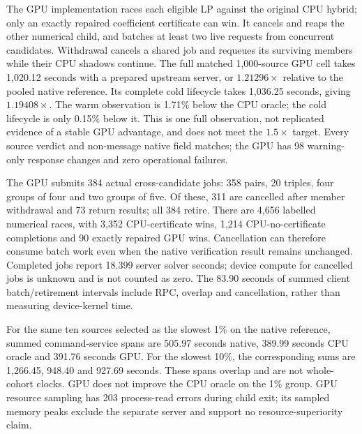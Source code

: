 \documentclass[10pt,twocolumn]{article}
\begin{document}
The GPU implementation races each eligible LP against the original CPU
hybrid; only an exactly repaired coefficient certificate can win.
It cancels and reaps the other numerical child, and batches at least two
live requests from concurrent candidates. Withdrawal cancels a shared job
and requeues its surviving members while their CPU shadows continue.
The full matched 1,000-source GPU cell takes 1,020.12 seconds with a
prepared upstream server, or $1.21296\times$ relative to the pooled native
reference. Its complete cold lifecycle takes 1,036.25 seconds, giving
$1.19408\times$. The warm observation is 1.71\% below the CPU oracle;
the cold lifecycle is only 0.15\% below it. This is one full observation,
not replicated evidence of a stable GPU advantage, and does not meet
the $1.5\times$ target. Every source verdict and non-message native field
matches; the GPU has 98 warning-only response changes and zero operational
failures.

The GPU submits 384 actual cross-candidate jobs: 358 pairs, 20 triples,
four groups of four and two groups of five. Of these, 311 are cancelled
after member withdrawal and 73 return results; all 384 retire.
There are 4,656 labelled numerical races, with 3,352 CPU-certificate wins,
1,214 CPU-no-certificate completions and 90 exactly repaired GPU wins.
Cancellation can therefore consume batch work even when the native
verification result remains unchanged.
Completed jobs report 18.399 server solver seconds; device compute for
cancelled jobs is unknown and is not counted as zero.
The 83.90 seconds of summed client batch/retirement intervals include RPC,
overlap and cancellation, rather than measuring device-kernel time.

For the same ten sources selected as the slowest 1\% on the native reference,
summed command-service spans are 505.97 seconds native, 389.99 seconds CPU
oracle and 391.76 seconds GPU. For the slowest 10\%, the corresponding sums
are 1,266.45, 948.40 and 927.69 seconds. These spans overlap and are not
whole-cohort clocks. GPU does not improve the CPU oracle on the 1\% group.
GPU resource sampling has 203 process-read errors during child exit;
its sampled memory peaks exclude the separate server and support no
resource-superiority claim.
\end{document}
